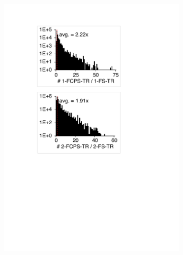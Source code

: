 \documentclass[acmsmall,review,screen]{acmart}
\begin{document}
\begin{figure}
\begin{subfigure}{0.24\textwidth}
    \includegraphics[width=\textwidth]{img/1-fcps-hist}
  \end{subfigure}
  \begin{subfigure}{0.24\textwidth}
    \centering

\end{subfigure}
\end{figure}
\end{document}
